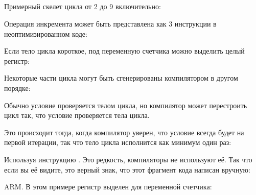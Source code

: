 ﻿\subsection{\Conclusion{}}

Примерный скелет цикла от 2 до 9 включительно:



Операция инкремента может быть представлена как 3 инструкции в неоптимизированном коде:



Если тело цикла короткое, под переменную счетчика можно выделить целый регистр:



Некоторые части цикла могут быть сгенерированы компилятором в другом порядке:



Обычно условие проверяется  телом цикла, но компилятор может перестроить цикл так, 
что условие проверяется  тела цикла.

Это происходит тогда, когда компилятор уверен, что условие всегда будет  на первой итерации,
так что тело цикла исполнится как минимум один раз:



Используя инструкцию . Это редкость, компиляторы не используют её.
Так что если вы её видите, это верный знак, что этот фрагмент кода написан вручную:



ARM. 
В этом примере регистр  выделен для переменной счетчика:




